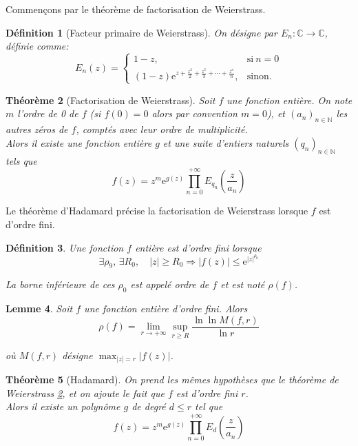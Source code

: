 \documentclass[french]{report}
\newtheorem{theorem}{Théorème}[section]
\newtheorem{definition}[theorem]{Définition}
\newtheorem{lemma}[theorem]{Lemme}
\begin{document}
Commençons par le théorème de factorisation de Weierstrass.

\begin{definition}[Facteur primaire de Weierstrass]
  On désigne par $E_n:\mathbb{C}\to\mathbb{C}$, définie comme:
  \begin{equation*}
    E_n(z)=
    \begin{cases}
      1-z, & \text{si}\ n=0\\
      (1-z)\mathrm{e}^{z+\frac{z^2}{2}+\frac{z^3}{3}+\cdots+\frac{z^n}{n}}, & \text{sinon}.
    \end{cases}
  \end{equation*}
\end{definition}

\begin{theorem}[Factorisation de Weierstrass]\label{thm:factorisation-weierstrass}
  Soit $f$ une fonction entière. On note $m$ l'ordre de 0 de $f$ (si $f(0)=0$ alors par convention $m=0$), et $(a_n)_{n\in\mathbb{N}}$ les autres zéros de $f$, comptés avec leur ordre de multiplicité.
  \\

  Alors il existe une fonction entière $g$ et une suite d'entiers naturels $(q_n)_{n\in\mathbb{N}}$ tels que
  \[
    f(z)=z^m\mathrm{e}^{g(z)}\prod_{n=0}^{+\infty}E_{q_n}\left(\frac{z}{a_n}\right)
  \]
\end{theorem}

Le théorème d'Hadamard précise la factorisation de Weierstrass lorsque $f$ est d'ordre fini.

\begin{definition}
  Une fonction $f$ entière est d'ordre fini lorsque
  \[
   \exists \rho_9,\,\exists R_0,\quad
   |z|\geq R_0\Longrightarrow|f(z)|\leq\mathrm{e}^{|z|^{\rho_0}}
  \]

  La borne inférieure de ces $\rho_0$ est appelé ordre de $f$ et est noté $\rho(f)$.
\end{definition}

\begin{lemma}
  Soit $f$ une fonction entière d'ordre fini. Alors
  \[
    \rho(f)=\lim_{r\to+\infty}\sup_{r\geq R}
    \frac{\ln\ln M(f,r)}{\ln r}
  \]

  où $M(f,r)$ désigne $\max_{|z|=r}|f(z)|$.
\end{lemma}

\begin{theorem}[Hadamard]\label{thm:factorisation-hadamard}
  On prend les mêmes hypothèses que le théorème de Weierstrass \ref{thm:factorisation-weierstrass}, et on ajoute le fait que $f$ est d'ordre fini $r$.
  \\
  Alors il existe un polynôme $g$ de degré $d\leq r$ tel que
  \[
    f(z)=z^m\mathrm{e}^{g(z)}\prod_{n=0}^{+\infty}E_d\left(\frac{z}{a_n}\right)
  \]
\end{theorem}
\end{document}
